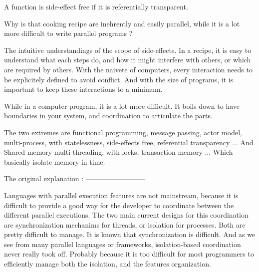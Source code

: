 A function is side-effect free if it is referentially transparent.




Why is that cooking recipe are inehrently and easily parallel, while it is a lot more difficult to write parallel programs ?

The intuitive understandings of the scope of side-effects.
In a recipe, it is easy to understand what each steps do, and how it might interfere with others, or which are required by others.
With the naivete of computers, every interaction needs to be explicitely defined to avoid conflict.
And with the size of programs, it is important to keep these interactions to a minimum.

While in a computer program, it is a lot more difficult.
It boils down to have boundaries in your system, and coordination to articulate the parts.

The two extremes are functional programming, message passing, actor model, multi-process, with statelessness, side-effects free, referential transparency ...
And Shared memory multi-threading, with locks, transaction memory ...
Which basically isolate memory in time.





The original explanation :
--------------------------

Languages with parallel execution features are not mainstream, because it is difficult to provide a good way for the developer to coordinate between the different parallel executions.
The two main current designs for this coordination are synchronization mechanims for threads, or isolation for processes.
Both are pretty difficult to manage.
It is known that synchronization is difficult. 
And as we see from many parallel languages or frameworks, isolation-based coordination never really took off. Probably because it is too difficult for most programmers to efficiently manage both the isolation, and the features organization.

